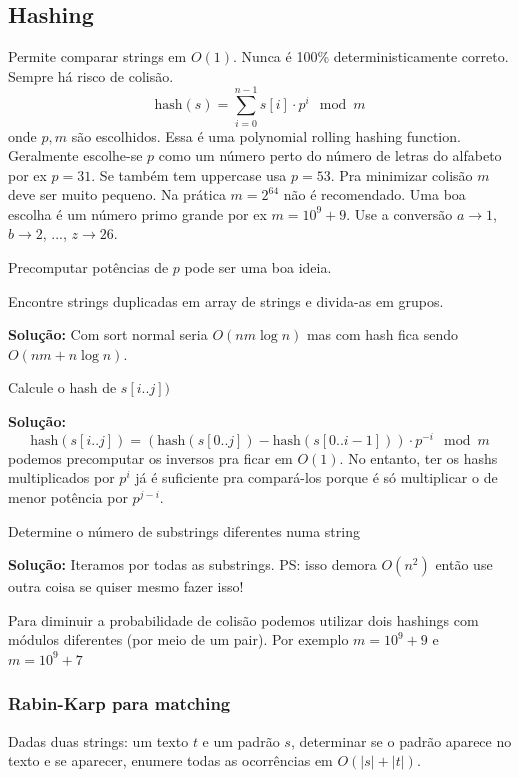 \subsection{Hashing}

Permite comparar strings em $O(1)$. Nunca é 100\% deterministicamente correto. Sempre há risco de colisão.
$$\text{hash}(s) = \sum\limits_{i=0}^{n-1} s[i] \cdot p^i \mod m$$
onde $p, m$ são escolhidos. Essa é uma polynomial rolling hashing function. Geralmente escolhe-se $p$ como um número perto do número de letras do alfabeto por ex $p = 31$. Se também tem uppercase usa $p=53$. Pra minimizar colisão $m$ deve ser muito pequeno. Na prática $m=2^{64}$ não é recomendado. Uma boa escolha é um número primo grande por ex $m = 10^9 + 9$. Use a conversão $a \to 1$, $b \to 2$, ..., $z \to 26$.


Precomputar potências de $p$ pode ser uma boa ideia.

 Encontre strings duplicadas em array de strings e divida-as em grupos. 

\textbf{Solução:} Com sort normal seria $O(nm \log n)$ mas com hash fica sendo $O(nm + n \log n)$.


 Calcule o hash de $s[i..j])$

\textbf{Solução:} $$\text{hash}(s[i..j]) = (\text{hash}(s[0..j]) - \text{hash}(s[0..i-1])) \cdot p^{-i} \mod m$$
podemos precomputar os inversos pra ficar em $O(1)$. No entanto, ter os hashs multiplicados por $p^i$ já é suficiente pra compará-los porque é só multiplicar o de menor potência por $p^{j-i}$.

 Determine o número de substrings diferentes numa string

\textbf{Solução:} Iteramos por todas as substrings. PS: isso demora $O(n^2)$ então use outra coisa se quiser mesmo fazer isso!

Para diminuir a probabilidade de colisão podemos utilizar dois hashings com módulos diferentes (por meio de um pair). Por exemplo $m=10^9+9$ e $m=10^9+7$

\subsubsection{Rabin-Karp para matching}

Dadas duas strings: um texto $t$ e um padrão $s$, determinar se o padrão aparece no texto e se aparecer, enumere todas as ocorrências em $O(|s|+|t|)$.

